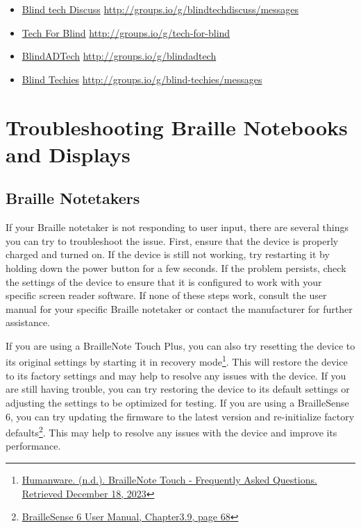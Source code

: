 \documentclass[12pt,letterpaper,twoside]{extreport}
\begin{document}
\begin{appendices}
\begin{itemize}[leftmargin=*]
\begin{itemize}[leftmargin=2em]
\item \href{http://groups.io/g/blindtechdiscuss/messages}{Blind tech Discuss}  \break\url{http://groups.io/g/blindtechdiscuss/messages}
\item \href{http://groups.io/g/tech-for-blind}{Tech For Blind}  \break\url{http://groups.io/g/tech-for-blind}
\item \href{http://groups.io/g/blindadtech}{BlindADTech}  \break\url{http://groups.io/g/blindadtech}
\item \href{http://groups.io/g/blind-techies/messages}{Blind Techies}  \break\url{http://groups.io/g/blind-techies/messages}
\end{itemize}
\end{itemize}

\cleardoublepage\hypertarget{trouble2}{}\chapter[\raggedright Troubleshooting Braille Notebooks and Displays\hfill\\]{Troubleshooting Braille Notebooks and Displays}\label{trouble2}
\minitoc \newpage
\hypertarget{notebook2}{}\section{Braille Notetakers}\label{notebook}
If your Braille notetaker is not responding to user input, there are several things you can try to troubleshoot the issue. First, ensure that the device is properly charged and turned on. If the device is still not working, try restarting it by holding down the power button for a few seconds. If the problem persists, check the settings of the device to ensure that it is configured to work with your specific screen reader software. If none of these steps work, consult the user manual for your specific Braille notetaker or contact the manufacturer for further assistance.

If you are using a BrailleNote Touch Plus, you can also try resetting the device to its original settings by starting it in recovery mode\footnote{\raggedright \href{http://www.humanware.com/microsite/bntouch/faq.ph}{Humanware. (n.d.). BrailleNote Touch - Frequently Asked Questions. Retrieved December 18, 2023}}. This will restore the device to its factory settings and may help to resolve any issues with the device. If you are still having trouble, you can try restoring the device to its default settings or adjusting the settings to be optimized for testing. If you are using a BrailleSense 6, you can try updating the firmware to the latest version and re-initialize factory defaults\footnote{\raggedright \href{http://hims-inc.com/wp-content/uploads/2023/11/BrailleSense-6-User-Manual-V2-1.pdf}{BrailleSense 6 User Manual, Chapter3.9, page 68}}. This may help to resolve any issues with the device and improve its performance.


\end{appendices}
\end{document}
